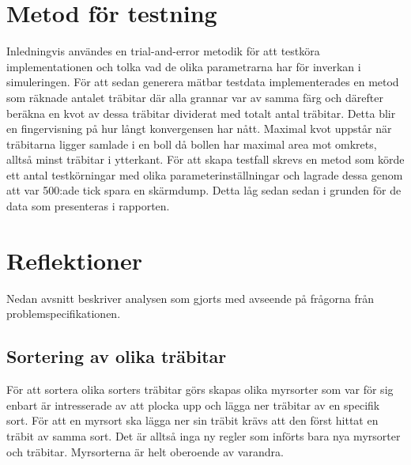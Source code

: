 \documentclass[titlepage, a4paper, 12pt]{article}
\begin{document}
\section{Metod för testning}

Inledningvis användes en trial-and-error metodik för att testköra
implementationen och tolka vad de olika parametrarna har för inverkan
i simuleringen. För att sedan generera mätbar testdata implementerades
en metod som räknade antalet träbitar där alla grannar var av samma
färg och därefter beräkna en kvot av dessa träbitar dividerat med
totalt antal träbitar. Detta blir en fingervisning på hur långt
konvergensen har nått. Maximal kvot uppstår när träbitarna ligger
samlade i en boll då bollen har maximal area mot omkrets, alltså minst
träbitar i ytterkant.  För att skapa testfall skrevs en metod som
körde ett antal testkörningar med olika parameterinställningar och
lagrade dessa genom att var 500:ade tick spara en skärmdump. Detta låg
sedan sedan i grunden för de data som presenteras i rapporten.


\section{Reflektioner}
Nedan avsnitt beskriver analysen som gjorts med avseende på frågorna
från problemspecifikationen.

\subsection{Sortering av olika träbitar}


För att sortera olika sorters träbitar görs skapas olika myrsorter som
var för sig enbart är intresserade av att plocka upp och lägga ner
träbitar av en specifik sort. För att en myrsort ska lägga ner sin
träbit krävs att den först hittat en träbit av samma sort. Det är
alltså inga ny regler som införts bara nya myrsorter och
träbitar. Myrsorterna är helt oberoende av varandra.
\end{document}
